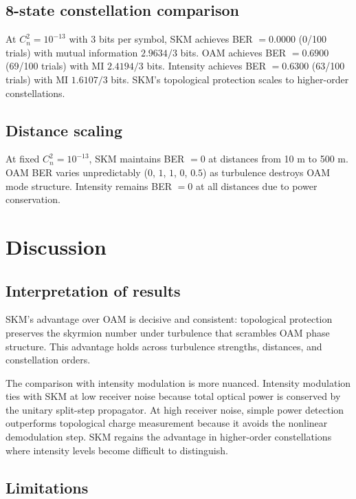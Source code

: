\documentclass[11pt]{article}
\begin{document}
\subsection{8-state constellation comparison}

At $C_n^2 = 10^{-13}$ with 3 bits per symbol, SKM achieves BER $=0.0000$
(0/100 trials) with mutual information $2.9634/3$ bits. OAM achieves
BER $=0.6900$ (69/100 trials) with MI $2.4194/3$ bits. Intensity achieves
BER $=0.6300$ (63/100 trials) with MI $1.6107/3$ bits. SKM's topological
protection scales to higher-order constellations.

\subsection{Distance scaling}

At fixed $C_n^2 = 10^{-13}$, SKM maintains BER $=0$ at distances from 10 m
to 500 m. OAM BER varies unpredictably ($0$, $1$, $1$, $0$, $0.5$) as
turbulence destroys OAM mode structure. Intensity remains BER $=0$ at all
distances due to power conservation.

\section{Discussion}

\subsection{Interpretation of results}

SKM's advantage over OAM is decisive and consistent: topological protection
preserves the skyrmion number under turbulence that scrambles OAM phase
structure. This advantage holds across turbulence strengths, distances,
and constellation orders.

The comparison with intensity modulation is more nuanced. Intensity
modulation ties with SKM at low receiver noise because total optical power
is conserved by the unitary split-step propagator. At high receiver noise,
simple power detection outperforms topological charge measurement because
it avoids the nonlinear demodulation step. SKM regains the advantage in
higher-order constellations where intensity levels become difficult to
distinguish.

\subsection{Limitations}
\end{document}
